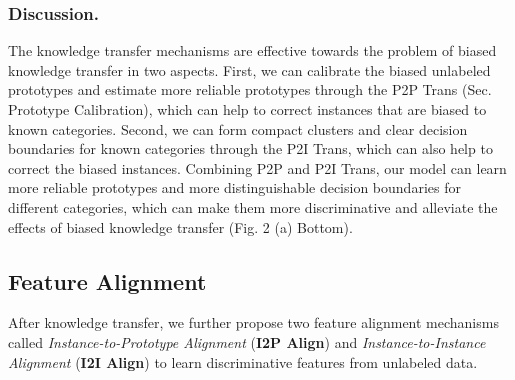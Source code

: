 \documentclass[letterpaper]{article} %
\begin{document}
\subsubsection{Discussion.} The knowledge transfer mechanisms are effective towards the problem of biased knowledge transfer in two aspects. First, we can calibrate the biased unlabeled prototypes and estimate more reliable prototypes through the P2P Trans (Sec. Prototype Calibration), which can help to correct instances that are biased to known categories. Second, we can form compact clusters and clear decision boundaries for known categories through the P2I Trans, which can also help to correct the biased instances. 
Combining P2P and P2I Trans, our model can learn more reliable prototypes and more distinguishable decision boundaries for different categories, which can make them more discriminative and alleviate the effects of biased knowledge transfer (Fig. 2 (a) Bottom).






\subsection{Feature Alignment}
After knowledge transfer, we further propose two feature alignment mechanisms called \textit{Instance-to-Prototype Alignment} (\textbf{I2P Align}) and \textit{Instance-to-Instance Alignment} (\textbf{I2I Align}) to learn discriminative features from unlabeled data.
\end{document}

